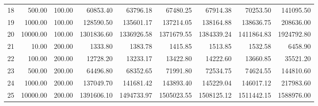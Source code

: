 \begin{table}[ht]
\begin{tabular}{rrrrrrrrr}
  18 & 500.00 & 100.00 & 60853.40 & 63796.18 & 67480.25 & 67914.38 & 70253.50 & 141095.50 \\ 
  19 & 1000.00 & 100.00 & 128590.50 & 135601.17 & 137214.05 & 138164.88 & 138636.75 & 208636.00 \\ 
  20 & 10000.00 & 100.00 & 1301836.60 & 1336926.58 & 1371679.55 & 1384339.24 & 1411864.83 & 1924792.80 \\ 
  21 & 10.00 & 200.00 & 1333.80 & 1383.78 & 1415.85 & 1513.85 & 1532.58 & 6458.90 \\ 
  22 & 100.00 & 200.00 & 12728.20 & 13233.17 & 13422.80 & 14222.60 & 13660.85 & 35521.20 \\ 
  23 & 500.00 & 200.00 & 64496.80 & 68352.65 & 71991.80 & 72534.75 & 74624.55 & 144810.60 \\ 
  24 & 1000.00 & 200.00 & 137049.70 & 141681.42 & 143893.40 & 145229.04 & 146017.12 & 217983.60 \\ 
  25 & 10000.00 & 200.00 & 1391606.10 & 1494733.97 & 1505023.55 & 1508125.12 & 1511442.15 & 1588976.00 \\ 
   \hline
\end{tabular}
\end{table}
